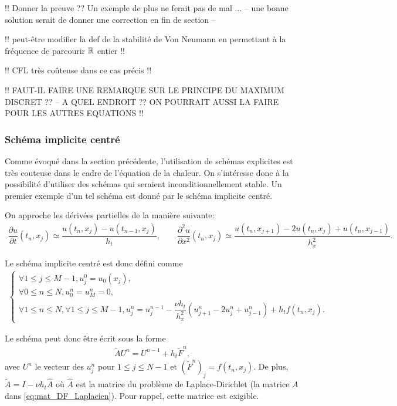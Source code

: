\documentclass[12pt,a4paper,twoside]{article}
\begin{document}
!! Donner la preuve ??
Un exemple de plus ne ferait pas de mal ...
-- une bonne solution serait de donner une correction en fin de section --

!! peut-\^etre modifier la def de la stabilit\'e de Von Neumann en permettant
\`a la fr\'equence de parcourir $\mathbb{R}$ entier !!

!! CFL tr\`es co\^uteuse dans ce cas pr\'ecis !!


!! FAUT-IL FAIRE UNE REMARQUE SUR LE PRINCIPE DU MAXIMUM DISCRET ??
-- A QUEL ENDROIT ?? ON POURRAIT AUSSI LA FAIRE POUR LES AUTRES EQUATIONS !!

\subsubsection{Sch\'ema implicite centr\'e}
\label{subsubsec:chaleur_DF_implicite}


Comme \'evoqu\'e dans la section pr\'ec\'edente, l'utilisation de sch\'emas
explicites est tr\`es couteuse dans le cadre de l'\'equation de la chaleur.
On s'int\'eresse donc \`a la possibilit\'e d'utiliser des sch\'emas
qui seraient inconditionnellement stable.
Un premier exemple d'un tel sch\'ema est donn\'e par le sch\'ema 
implicite centr\'e.


On approche les d\'eriv\'ees partielles de la mani\`ere suivante:
\begin{align*}
  \dfrac{\partial u}{\partial t}(t_n,x_j) \simeq \dfrac{u(t_{n},x_j) - u(t_{n-1},x_j)}{h_t} ,
  \qquad 
  \dfrac{\partial^2 u}{\partial x^2}(t_n,x_j) 
  \simeq \dfrac{u(t_{n},x_{j+1}) - 2 u(t_n,x_j) + u(t_n,x_{j-1})}{h_x^2} .
\end{align*}




Le sch\'ema implicite centr\'e est donc d\'efini comme
\begin{align}
  \label{eq:chaleur_DF_imp_centre}
  \left\{
  \begin{array}{l}
    \forall 1 \leq j \leq M-1 , 
    u_j^0 = u_0(x_j) ,
    \\
    \forall 0 \leq n \leq N, u_0^n = u_M^n = 0 ,
    \\
    \forall 1 \leq n \leq N, \forall 1 \leq j \leq M-1,
    u_j^{n} = u_j^{n-1} - \dfrac{\nu h_t}{h_x^2} (u_{j+1}^{n} - 2 u_{j}^{n} + u_{j-1}^{n} ) 
    + h_t f(t_n,x_j) .
  \end{array}
  \right.
\end{align}

Le sch\'ema peut donc \^etre \'ecrit sous la forme
\begin{align*}
  \widetilde{A} U^n = U^{n-1} + h_t \widetilde{F}^n ,
\end{align*}
avec $U^n$ le vecteur des $u_j^n$ pour $1 \leq j \leq N-1$ et $(\widetilde{F}^n)_j = f(t_n,x_j)$. 
De plus, $\widetilde{A} = I - \nu h_t \widehat{A}$ o\`u $\widehat{A}$ est la matrice
du probl\`eme de Laplace-Dirichlet (la matrice $A$ dans \eqref{eq:mat_DF_Laplacien}).
Pour rappel, cette matrice est exigible.
\end{document}

